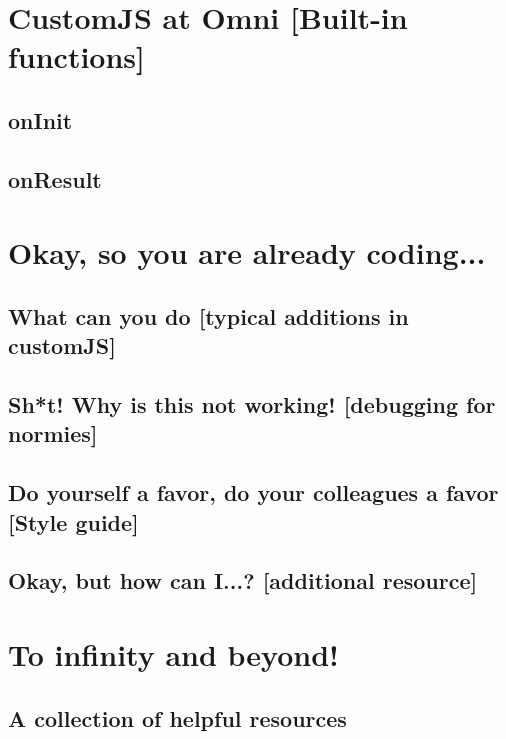 \documentclass[11pt,a4paper,oldfontcommands]{memoir}
\begin{document}
\chapter{CustomJS at Omni \small{[Built-in functions]}}
    \label{chap:omni}
    
    \section{onInit}
    \label{sec:oninit}
    
    
    \section{onResult}
    \label{sec:onresult}
    

\chapter{Okay, so you are already coding...}
    \label{chap:coding}

    \section{What can you do \small{[typical additions in customJS]}}
    
    
    \section{Sh*t! Why is this not working! \small{[debugging for normies]}}
    
    
    \section{Do yourself a favor, do your colleagues a favor \small{[Style guide]}}
    
    

\section{Okay, but how can I...? \small{[additional resource]}}


\appendix

\chapter{To infinity and beyond!}
\section{A collection of helpful resources}




\end{document}
